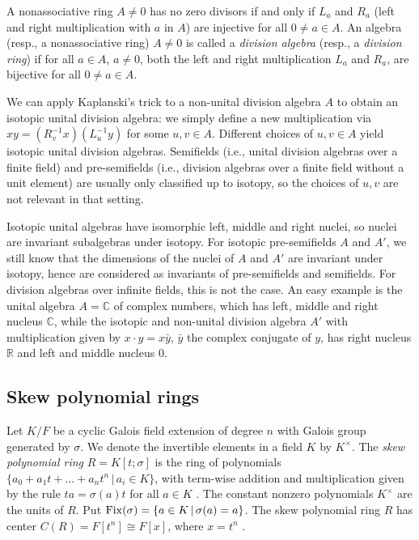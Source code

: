 \documentclass[12pt]{amsart}
\theoremstyle{plain}
\theoremstyle{definition}
\numberwithin{equation}{section}
\numberwithin{figure}{section}
\begin{document}
A nonassociative ring $A\not=0$ has no zero divisors if and only if
$L_a$ and $R_a$ (left and right multiplication with $a$ in $A$) are injective for all $0\not=a\in A$.   An algebra (resp., a nonassociative ring) $A\not=0$  is called a {\it division algebra} (resp., a {\it division ring}) if for all $a\in A$, $a\not=0$, both
the left and right multiplication $L_a$ and $R_a$, are bijective for all $0\not=a\in A$.

 We can apply Kaplanski's trick to a non-unital division algebra $A$ to obtain an isotopic unital division algebra:
we simply define a new multiplication via $x  y=(R_v^{-1}x) (L_u^{-1}y)$ for some $u,v\in A$.
  Different choices of $u, v\in A$  yield isotopic unital division algebras.
  Semifields (i.e., unital division algebras over a finite field) and pre-semifields (i.e., division algebras over a finite field without a unit element) are usually only classified up to isotopy, so the choices of $u,v$ are not relevant in that setting.

  Isotopic unital algebras have isomorphic left, middle and right nuclei, so nuclei are invariant subalgebras under isotopy.
For isotopic pre-semifields $A$ and $A'$, we still know that the dimensions of the nuclei of $A$ and $A'$ are invariant under isotopy, hence are considered as invariants of pre-semifields and semifields.
For division algebras over infinite fields, this is not the case. An easy example is the unital algebra $A=\mathbb{C}$ of complex numbers, which has left, middle and right nucleus $\mathbb{C}$, while the isotopic and non-unital division algebra $A'$ with multiplication given by $x\cdot y=x \bar y$, $\bar y$ the complex conjugate of $y$, has  right nucleus $\mathbb{R}$ and left and middle nucleus  $0$.


\subsection{Skew polynomial rings}\label{subsec:skewpol}
Let $K/F$ be a cyclic Galois field extension of degree $n$ with Galois group generated by $\sigma$. We denote the invertible elements in a field $K$ by $K^\times$.
 The \emph{skew polynomial ring} $R=K[t;\sigma]$
is the ring of polynomials $\{a_0+a_1t+\dots +a_nt^n\,|\, a_i\in K\}$, with term-wise addition and multiplication given by the rule
$ta=\sigma(a)t$ for all $a\in K$  \cite[Chapter I]{J96}. The constant nonzero polynomials $K^\times$ are the units of $R$. Put ${\rm Fix}(\sigma)=\{a\in K\,|\, \sigma(a)=a\}$. The skew polynomial ring $R$ has center $C(R) = F[t^n]\cong F[x]$,
 where $x=t^n$ \cite[Theorem 1.1.22]{J96}.
\end{document}
